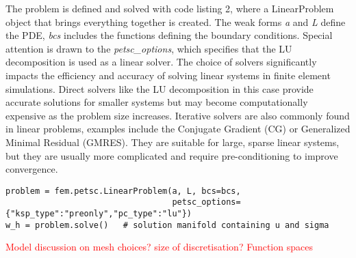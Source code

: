 The problem is defined and solved with code listing 2, where a LinearProblem object that brings everything together is created. The weak forms \textit{a} and \textit{L} define the PDE, \textit{bcs} includes the functions defining the boundary conditions. Special attention is drawn to the \textit{petsc\_options}, which specifies that the LU decomposition is used as a linear solver. The choice of solvers significantly impacts the efficiency and accuracy of solving linear systems in finite element simulations. Direct solvers like the LU decomposition in this case provide accurate solutions for smaller systems but may become computationally expensive as the problem size increases. Iterative solvers are also commonly found in linear problems, examples include the Conjugate Gradient (CG) or Generalized Minimal Residual (GMRES). They are suitable for large, sparse linear systems, but they are usually more complicated and require pre-conditioning to improve convergence.

\begin{lstlisting}[frame=single, caption={Defining and solving the porblem}, basicstyle=\scriptsize]
problem = fem.petsc.LinearProblem(a, L, bcs=bcs, 
                                  petsc_options={"ksp_type":"preonly","pc_type":"lu"})
w_h = problem.solve()   # solution manifold containing u and sigma
\end{lstlisting}

\vspace{1cm}

\textcolor{red}{Model discussion on mesh choices? size of discretisation? Function spaces}

\newpage